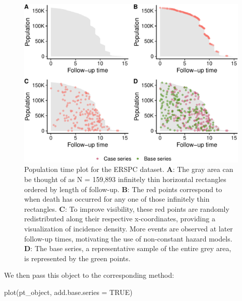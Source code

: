 \begin{Schunk}
\begin{figure}[ht]
\includegraphics[width=\textwidth,keepaspectratio=true]{./plot-erspc-data-1} \caption{Population time plot for the ERSPC dataset. \textbf{A}: The gray area can be thought of as N = 159,893 infinitely thin horizontal rectangles ordered by length of follow-up. \textbf{B}: The red points correspond to when death has occurred for any one of those infinitely thin rectangles. \textbf{C}: To improve visibility, these red points are randomly redistributed along their respective x-coordinates, providing a visualization of incidence density. More events are observed at later follow-up times, motivating the use of non-constant hazard models. \textbf{D}: The base series, a representative sample of the entire grey area, is represented by the green points.}\label{fig:plot-erspc-data}
\end{figure}
\end{Schunk}

We then pass this object to the corresponding  method:

\begin{Schunk}
\begin{Sinput}
plot(pt_object, add.base.series = TRUE)
\end{Sinput}
\end{Schunk}

